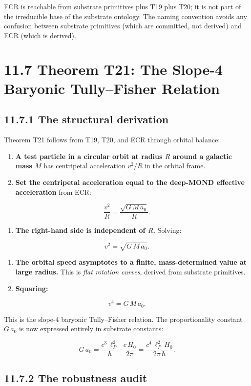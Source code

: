 \documentclass[11pt]{book}
\begin{document}
ECR is reachable from substrate primitives plus T19 plus T20; it is not part of the irreducible base of the substrate ontology. The naming convention avoids any confusion between substrate primitives (which are committed, not derived) and ECR (which is derived).

\section{11.7 Theorem T21: The Slope-4 Baryonic Tully–Fisher Relation}

\subsection{11.7.1 The structural derivation}

Theorem T21 follows from T19, T20, and ECR through orbital balance:

\begin{enumerate}
\item \textbf{A test particle in a circular orbit at radius $R$ around a galactic mass $M$} has centripetal acceleration $v^2/R$ in the orbital frame.
\item \textbf{Set the centripetal acceleration equal to the deep-MOND effective acceleration} from ECR:
\end{enumerate}
\[
\frac{v^2}{R} = \frac{\sqrt{G\,M\,a_0}}{R}.
\]
\begin{enumerate}
\item \textbf{The right-hand side is independent of $R$.} Solving:
\end{enumerate}
\[
v^2 = \sqrt{G\,M\,a_0}.
\]
\begin{enumerate}
\item \textbf{The orbital speed asymptotes to a finite, mass-determined value at large radius.} This is \textit{flat rotation curves}, derived from substrate primitives.
\item \textbf{Squaring:}
\end{enumerate}
\[
v^4 = G\,M\,a_0.
\]

This is the slope-4 baryonic Tully–Fisher relation. The proportionality constant $G\,a_0$ is now expressed entirely in substrate constants:

\[
G\,a_0 = \frac{c^3\,\ell_P^2}{\hbar}\cdot\frac{c\,H_0}{2\pi} = \frac{c^4\,\ell_P^2\,H_0}{2\pi\,\hbar}.
\]

\subsection{11.7.2 The robustness audit}
\end{document}
